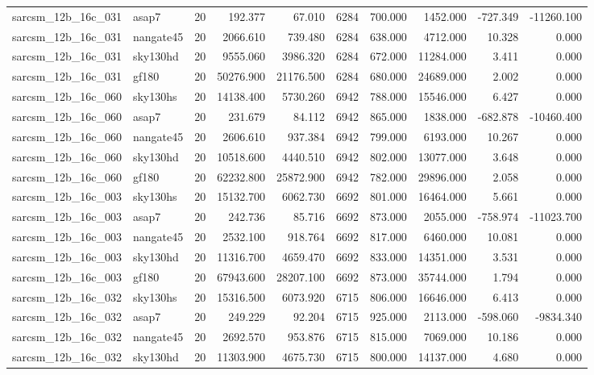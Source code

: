\documentclass{article}
\begin{document}
\begin{longtable}{llrrrrrrrr}
sarcsm\_12b\_16c\_031 & asap7 & 20 & 192.377 & 67.010 & 6284 & 700.000 & 1452.000 & -727.349 & -11260.100 \\
sarcsm\_12b\_16c\_031 & nangate45 & 20 & 2066.610 & 739.480 & 6284 & 638.000 & 4712.000 & 10.328 & 0.000 \\
sarcsm\_12b\_16c\_031 & sky130hd & 20 & 9555.060 & 3986.320 & 6284 & 672.000 & 11284.000 & 3.411 & 0.000 \\
sarcsm\_12b\_16c\_031 & gf180 & 20 & 50276.900 & 21176.500 & 6284 & 680.000 & 24689.000 & 2.002 & 0.000 \\
sarcsm\_12b\_16c\_060 & sky130hs & 20 & 14138.400 & 5730.260 & 6942 & 788.000 & 15546.000 & 6.427 & 0.000 \\
sarcsm\_12b\_16c\_060 & asap7 & 20 & 231.679 & 84.112 & 6942 & 865.000 & 1838.000 & -682.878 & -10460.400 \\
sarcsm\_12b\_16c\_060 & nangate45 & 20 & 2606.610 & 937.384 & 6942 & 799.000 & 6193.000 & 10.267 & 0.000 \\
sarcsm\_12b\_16c\_060 & sky130hd & 20 & 10518.600 & 4440.510 & 6942 & 802.000 & 13077.000 & 3.648 & 0.000 \\
sarcsm\_12b\_16c\_060 & gf180 & 20 & 62232.800 & 25872.900 & 6942 & 782.000 & 29896.000 & 2.058 & 0.000 \\
sarcsm\_12b\_16c\_003 & sky130hs & 20 & 15132.700 & 6062.730 & 6692 & 801.000 & 16464.000 & 5.661 & 0.000 \\
sarcsm\_12b\_16c\_003 & asap7 & 20 & 242.736 & 85.716 & 6692 & 873.000 & 2055.000 & -758.974 & -11023.700 \\
sarcsm\_12b\_16c\_003 & nangate45 & 20 & 2532.100 & 918.764 & 6692 & 817.000 & 6460.000 & 10.081 & 0.000 \\
sarcsm\_12b\_16c\_003 & sky130hd & 20 & 11316.700 & 4659.470 & 6692 & 833.000 & 14351.000 & 3.531 & 0.000 \\
sarcsm\_12b\_16c\_003 & gf180 & 20 & 67943.600 & 28207.100 & 6692 & 873.000 & 35744.000 & 1.794 & 0.000 \\
sarcsm\_12b\_16c\_032 & sky130hs & 20 & 15316.500 & 6073.920 & 6715 & 806.000 & 16646.000 & 6.413 & 0.000 \\
sarcsm\_12b\_16c\_032 & asap7 & 20 & 249.229 & 92.204 & 6715 & 925.000 & 2113.000 & -598.060 & -9834.340 \\
sarcsm\_12b\_16c\_032 & nangate45 & 20 & 2692.570 & 953.876 & 6715 & 815.000 & 7069.000 & 10.186 & 0.000 \\
sarcsm\_12b\_16c\_032 & sky130hd & 20 & 11303.900 & 4675.730 & 6715 & 800.000 & 14137.000 & 4.680 & 0.000 \\

\end{longtable}
\end{document}
